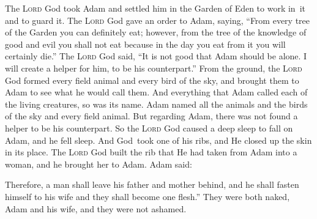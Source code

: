 \begin{inparaenum}
     The \textsc{Lord} God took Adam and settled him in the Garden of Eden to work in\understood\ it and to guard it.%
     The \textsc{Lord} God gave an order to Adam, saying, ``From every tree of the Garden you can definitely eat;%
     however, from the tree of the knowledge of good and evil you shall not eat because in the day you eat from it you will certainly die.''%
     The \textsc{Lord} God said, ``It is not good that Adam should be alone. I will create a helper for him, to be his counterpart.''%
     From the ground, the \textsc{Lord} God formed every field animal and every bird of the sky, and brought them to Adam to see what he would call them. And everything that Adam called each of the living creatures, so was its name.%
     Adam named all the animals and the birds of the sky and every field animal. But regarding Adam, there was not found a helper to be his counterpart.%
     So the \textsc{Lord} God caused a deep sleep to fall on Adam, and he fell sleep. And God\understood\ took one of his ribs, and He closed up the skin in its place.%
     The \textsc{Lord} God built the rib that He had taken from Adam into a woman, and he brought her to Adam.%
     Adam said:%
    
    
    
     Therefore, a man shall leave his father and mother behind, and he shall fasten himself to his wife and they shall become one flesh.''%
     They were both naked, Adam and his wife, and they were not ashamed.%
\end{inparaenum}

